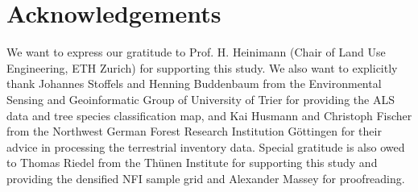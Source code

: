 
\section*{Acknowledgements}
\thispagestyle{plain}
We want to express our gratitude to Prof. H. Heinimann (Chair of Land Use Engineering, ETH Zurich) for supporting this study. We also want to explicitly thank Johannes Stoffels and Henning Buddenbaum from the Environmental Sensing and Geoinformatic Group of University of Trier for providing the ALS data and tree species classification map, and Kai Husmann and Christoph Fischer from the Northwest German Forest Research Institution Göttingen for their advice in processing the terrestrial inventory data. Special gratitude is also owed to Thomas Riedel from the Th{\"u}nen Institute for supporting this study and providing the densified NFI sample grid and Alexander Massey for proofreading.
